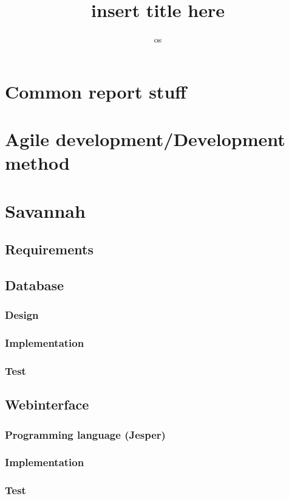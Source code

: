 

\title{insert title here} %
\author{os} %


\maketitle
\tableofcontents

\chapter{Common report stuff} %
\chapter{Agile development/Development method} %
\chapter{Savannah} %
  \section{Requirements}
  \section{Database}
    \subsection{Design}
    \subsection{Implementation}
    \subsection{Test}

  \section{Webinterface}
     \subsection{Programming language (Jesper)}
      
     \subsection{Implementation}
     \subsection{Test}

